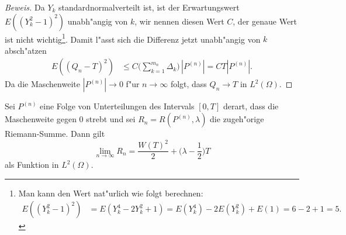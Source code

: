 \begin{proof}[Beweis]
Da $Y_k$ standardnormalverteilt ist, ist der Erwartungswert $E((Y_k^2-1)^2)$
unabh"angig von $k$, wir nennen diesen Wert $C$, der genaue Wert ist
nicht wichtig\footnote{Man kann den Wert nat"urlich wie folgt berechnen:
\begin{align*}
E((Y_k^2-1)^2)
&=
E(Y_k^4-2Y_k^2+1)
=
E(Y_k^4)-2E(Y_k^2)+E(1)
=
6-2+1=5.
\end{align*}}.
Damit l"asst sich die Differenz jetzt unabh"angig von $k$ absch"atzen
\begin{align*}
E((Q_n-T)^2)
&
\le
C\biggl(\sum_{k=1}^{m_n}\Delta_k\biggr)\, |P^{(n)}|
=CT|P^{(n)}|.
\end{align*}
Da die Maschenweite $|P^{(n)}|\to 0$ f"ur $n\to\infty$ folgt, dass
$Q_n\to T$ in $L^2(\Omega)$.
\end{proof}

\begin{hilfssatz}
\label{stochastisch:intwdw}
Sei $P^{(n)}$ eine Folge von Unterteilungen des
Intervals $[0,T]$ derart, dass die Maschenweite gegen $0$ strebt und
sei $R_n=R(P^{(n)},\lambda)$ die zugeh"orige Riemann-Summe.
Dann gilt
\[
\lim_{n\to\infty} R_n = \frac{W(T)^2}2 + \biggl(\lambda-\frac12\biggr)T
\]
als Funktion in $L^2(\Omega)$.
\end{hilfssatz}

